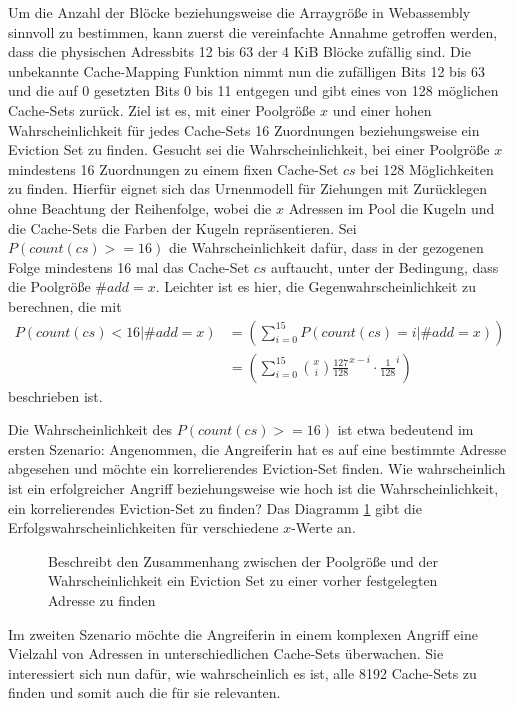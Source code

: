 Um die Anzahl der Blöcke beziehungsweise die Arraygröße in Webassembly sinnvoll zu bestimmen, kann zuerst die vereinfachte Annahme getroffen werden, dass die physischen Adressbits 12 bis 63 der 4 KiB Blöcke zufällig sind. 
Die unbekannte Cache-Mapping Funktion nimmt nun die zufälligen Bits 12 bis 63 und die auf 0 gesetzten Bits 0 bis 11 entgegen und gibt eines von 128 möglichen Cache-Sets zurück.
Ziel ist es, mit einer Poolgröße $x$ und einer hohen Wahrscheinlichkeit für jedes Cache-Sets 16 Zuordnungen beziehungsweise ein Eviction Set zu finden.
Gesucht sei die Wahrscheinlichkeit, bei einer Poolgröße $x$ mindestens 16 Zuordnungen zu einem fixen Cache-Set $cs$ bei 128 Möglichkeiten zu finden.
Hierfür eignet sich das Urnenmodell für Ziehungen mit Zurücklegen ohne Beachtung der Reihenfolge, wobei die $x$ Adressen im Pool die Kugeln und die Cache-Sets die Farben der Kugeln repräsentieren. Sei $P(count(cs)>=16)$ die Wahrscheinlichkeit dafür, dass in der gezogenen Folge mindestens 16 mal das Cache-Set $cs$ auftaucht, unter der Bedingung, dass die Poolgröße $\#add = x$.
Leichter ist es hier, die Gegenwahrscheinlichkeit zu berechnen, die mit
\begin{align*}
P(count(cs)<16|\#add = x) &=
\left( \sum\limits_{i=0}^{15}P(count(cs)=i|\#add = x) \right) \\&=
\left( \sum\limits_{i=0}^{15} {x \choose i} \frac{127}{128}^{x-i} \cdot \frac{1}{128}^i  \right)
\end{align*}
beschrieben ist.

Die Wahrscheinlichkeit des $P(count(cs)>=16)$ ist etwa bedeutend im ersten Szenario:
Angenommen, die Angreiferin hat es auf eine bestimmte Adresse abgesehen und möchte ein korrelierendes Eviction-Set finden. 
Wie wahrscheinlich ist ein erfolgreicher Angriff beziehungsweise wie hoch ist die Wahrscheinlichkeit, ein korrelierendes Eviction-Set zu finden? 
Das Diagramm \ref{fig:prob_specific_es} gibt die Erfolgswahrscheinlichkeiten für verschiedene $x$-Werte an. 

\begin{figure}[h]
\label{fig:prob_specific_es}
\centering
\begin{scaletikzpicturetowidth}{\textwidth}

\end{scaletikzpicturetowidth}
\caption{Beschreibt den Zusammenhang zwischen der Poolgröße und der Wahrscheinlichkeit ein Eviction Set zu einer vorher festgelegten Adresse zu finden}
\end{figure}
Im zweiten Szenario möchte die Angreiferin in einem komplexen Angriff eine Vielzahl von Adressen in unterschiedlichen Cache-Sets überwachen. 
Sie interessiert sich nun dafür, wie wahrscheinlich es ist, alle 8192 Cache-Sets zu finden und somit auch die für sie relevanten. 

